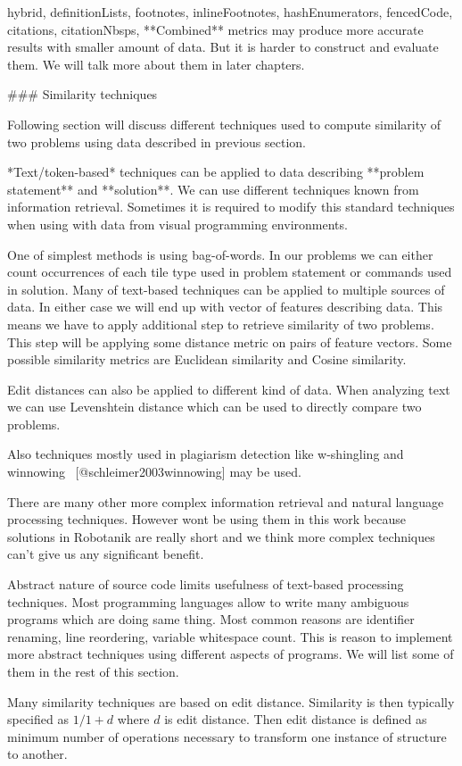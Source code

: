 \documentclass[
  digital, %
  table,   %
  lof,     %
  lot,     %
]{fithesis3}
\begin{document}
\begin{markdown*}{%
  hybrid,
  definitionLists,
  footnotes,
  inlineFootnotes,
  hashEnumerators,
  fencedCode,
  citations,
  citationNbsps,
}
**Combined** metrics may produce more accurate results with smaller amount of data. But it is harder to construct and evaluate them. We will talk more about them in later chapters.

### Similarity techniques

Following section will discuss different techniques used to compute similarity of two problems using data described in previous section.

*Text/token-based* techniques can be applied to data describing **problem statement** and **solution**. We can use different techniques known from information retrieval. Sometimes it is required to modify this standard techniques when using with data from visual programming environments.

One of simplest methods is using bag-of-words. In our problems we can either count occurrences of each tile type used in problem statement or commands used in solution. Many of text-based techniques can be applied to multiple sources of data. In either case we will end up with vector of features describing data. This means we have to apply additional step to retrieve similarity of two problems. This step will be applying some distance metric on pairs of feature vectors. Some possible similarity metrics are Euclidean similarity and Cosine similarity.

Edit distances can also be applied to different kind of data. When analyzing text we can use Levenshtein distance which can be used to directly compare two problems.

Also techniques mostly used in plagiarism detection like w-shingling and winnowing ~[@schleimer2003winnowing] may be used.

There are many other more complex information retrieval and natural language processing techniques. However wont be using them in this work because solutions in Robotanik are really short and we think more complex techniques can't give us any significant benefit.

Abstract nature of source code limits usefulness of text-based processing techniques. Most programming languages allow to write many ambiguous programs which are doing same thing. Most common reasons are identifier renaming, line reordering, variable whitespace count. This is reason to implement more abstract techniques using different aspects of programs. We will list some of them in the rest of this section.

Many similarity techniques are based on edit distance. Similarity is then typically specified as $1/{1+d}$ where $d$ is edit distance. Then edit distance is defined as minimum number of operations necessary to transform one instance of structure to another.


\end{markdown*}
\end{document}
